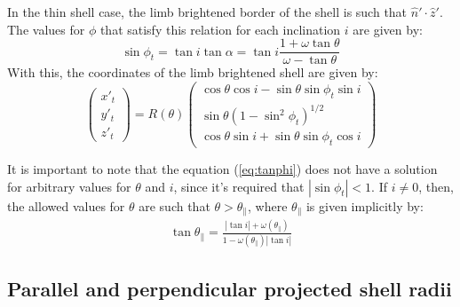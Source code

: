 In the thin shell case, the limb brightened border of the shell is such that $\hat{n}'\cdot \hat{z}'$. 
The values for $\phi$ that satisfy this relation for each inclination $i$ are given by:
\begin{equation}
\sin\phi_t = \tan i\tan\alpha = \tan i \frac{1+\omega\tan\theta}{\omega-\tan\theta}
\label{eq:tanphi}
\end{equation}
With this, the coordinates of the limb brightened shell are given by:
\begin{equation}
\left(\begin{array}{c}
x'_t \\ y'_t \\ z'_t
\end{array}\right)= R(\theta)\left(\begin{array}{c}
\cos\theta\cos i - \sin\theta\sin\phi_t \sin i \\
\sin\theta(1-\sin^2\phi_t)^{1/2} \\
\cos\theta\sin i +\sin\theta\sin\phi_t\cos i
\end{array}\right)
\label{eq:tangential}
\end{equation} 

It is important to note that the equation (\ref{eq:tanphi}) does not have a solution for arbitrary values for $\theta$ and $i$, since
it's required that $|\sin\phi_t|<1$. If $i\neq 0$, then, the  allowed values for $\theta$ are such that $\theta > \theta_\parallel$, where
$\theta_\parallel$ is given implicitly by:
\begin{align}
\tan\theta_\parallel = \frac{|\tan i| + \omega(\theta_\parallel)}{1-\omega(\theta_\parallel) |\tan i|}
\label{eq:thetapar}
\end{align}

\subsection{Parallel and perpendicular projected shell radii}

